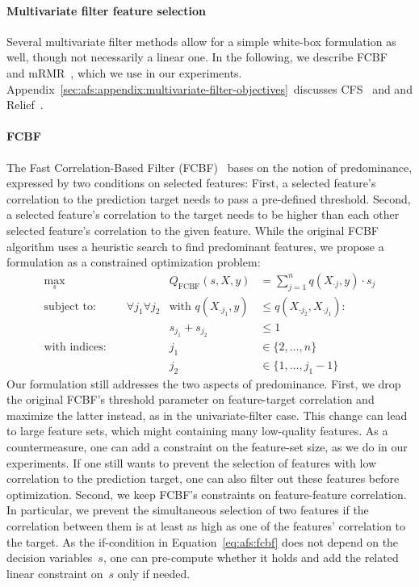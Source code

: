 \documentclass{article}
\theoremstyle{definition}
\begin{document}
\paragraph{Multivariate filter feature selection}

Several multivariate filter methods allow for a simple white-box formulation as well, though not necessarily a linear one.
In the following, we describe FCBF~\cite{yu2003feature} and mRMR~\cite{peng2005feature}, which we use in our experiments.
Appendix~\ref{sec:afs:appendix:multivariate-filter-objectives}~discusses CFS~\cite{hall1999correlation, hall2000correlation} and and Relief~\cite{kira1992feature, robnik1997adaptation}.

\paragraph{FCBF}

The Fast Correlation-Based Filter (FCBF)~\cite{yu2003feature} bases on the notion of predominance, expressed by two conditions on selected features:
First, a selected feature's correlation to the prediction target needs to pass a pre-defined threshold.
Second, a selected feature's correlation to the target needs to be higher than each other selected feature's correlation to the given feature.
While the original FCBF algorithm uses a heuristic search to find predominant features, we propose a formulation as a constrained optimization problem:
%
\begin{equation}
	\begin{aligned}
		\max_s &\quad & Q_{\text{FCBF}}(s,X,y) &= \sum_{j=1}^{n} q(X_{\cdot{}j},y) \cdot s_j \\
		\text{subject to:} &\quad \forall j_1 \forall j_2 & \text{with } q(X_{\cdot{}j_1},y) &\leq q(X_{\cdot{}j_2}, X_{\cdot{}j_1}): \\
		&\quad & s_{j_1} + s_{j_2} &\leq 1 \\
		\text{with indices:} &\quad & j_1 &\in \{2, \dots, n\} \\
		&\quad & j_2 &\in \{1, \dots, j_1 - 1\}
	\end{aligned}
	\label{eq:afs:fcbf}
\end{equation}
%
Our formulation still addresses the two aspects of predominance.
First, we drop the original FCBF's threshold parameter on feature-target correlation and maximize the latter instead, as in the univariate-filter case.
This change can lead to large feature sets, which might containing many low-quality features.
As a countermeasure, one can add a constraint on the feature-set size, as we do in our experiments.
If one still wants to prevent the selection of features with low correlation to the prediction target, one can also filter out these features before optimization.
Second, we keep FCBF's constraints on feature-feature correlation.
In particular, we prevent the simultaneous selection of two features if the correlation between them is at least as high as one of the features' correlation to the target.
As the if-condition in Equation~\ref{eq:afs:fcbf} does not depend on the decision variables~$s$, one can pre-compute whether it holds and add the related linear constraint on~$s$ only if needed.
\end{document}
